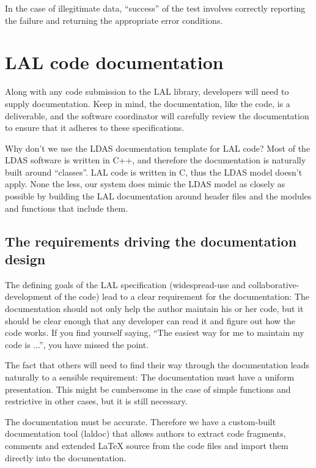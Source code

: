 \documentclass[]{ligodcc}
\begin{document}
In the case of illegitimate data, ``success'' of the test involves
correctly reporting the failure and  returning the appropriate error
conditions.

\section{LAL code documentation}
\label{sec:laldocumentation}

Along with any code submission to the LAL library, developers  will
need to supply documentation. Keep in mind, the documentation, like
the code, is a deliverable, and the software coordinator will
carefully review the documentation to ensure that  it adheres to these
specifications.

Why don't we use the LDAS documentation template for LAL code? Most of
the LDAS software is written in C++, and therefore the documentation
is naturally built around ``classes''. LAL code is written in C, thus
the LDAS model doesn't apply. None the less, our system does mimic the
LDAS model as closely as possible by building the LAL documentation
around header files and the modules and functions that include them.

\subsection{The requirements driving  the documentation design}

The defining goals of the LAL specification (widespread-use and
collaborative-development of the code) lead to a clear requirement for
the documentation: The documentation should not  only help the author
maintain his or her code, but it should be clear enough that any
developer can read it and figure out how the code works. If you find
yourself saying, ``The easiest way for me to maintain my code is
...'',  you have missed the point.

The fact that others will need to find their way through the
documentation  leads naturally to a sensible requirement: The
documentation must have a uniform presentation. This might be
cumbersome in the case of simple functions  and restrictive in other
cases, but it is still necessary.

The documentation must be accurate. Therefore we have a custom-built
documentation tool (laldoc) that  allows authors to extract code
fragments, comments and extended LaTeX source from the code files and
import them  directly into the documentation.
\end{document}
